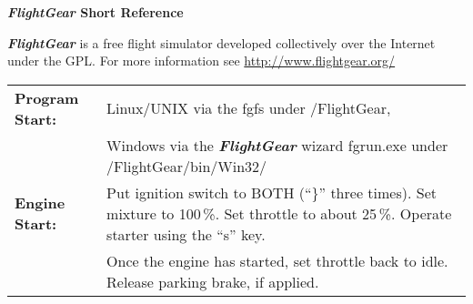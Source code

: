 \documentclass[10pt]{article}
\newcommand{\FlightGear}{{\itshape\bfseries FlightGear}}
\newcommand{\web}[1]{\href{#1}{#1}}
\newcommand{\longpage}{\enlargethispage{\baselineskip}}
\begin{document}
\longpage

\centerline{\large \textbf{\FlightGear{} Short Reference}}
\medskip

\scriptsize \noindent
 \FlightGear{} is a free flight simulator developed collectively over the
 Internet under the GPL.  For more information see  \web{http://www.flightgear.org/}\\

\hspace*{-8mm}
\begin{tabular}{ll}
\textbf{Program Start:}  & Linux/UNIX via the fgfs under /FlightGear,\\
                         & Windows via the \FlightGear{} wizard fgrun.exe under /FlightGear/bin/Win32/\\
\textbf{Engine Start:}   & Put ignition switch to BOTH (``\}'' three times). Set mixture to 100\,\%.
                           Set throttle to about 25\,\%. Operate starter using the ``s'' key. \\
                         & Once the engine has started, set throttle back to idle.
                           Release parking brake, if applied.
\end{tabular}
\medskip
\end{document}
